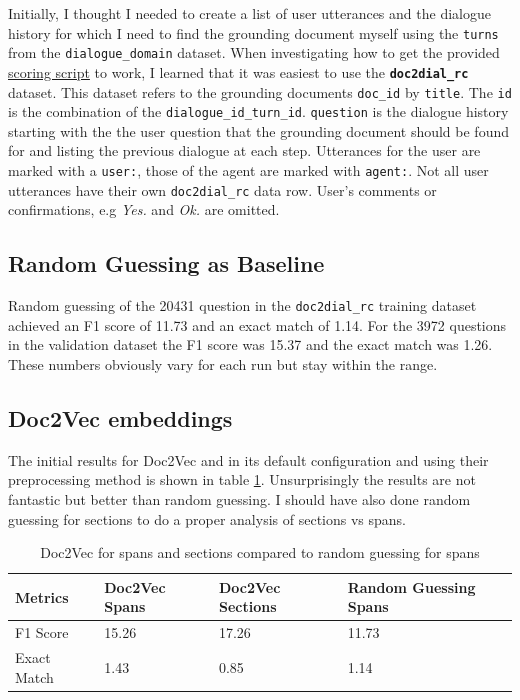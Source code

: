 \documentclass[11pt]{article}
\begin{document}
    Initially, I thought I needed to create a list of user utterances and the dialogue history for which I need to find the
    grounding document myself using the \texttt{turns} from the \texttt{dialogue\_domain} dataset. When investigating how
    to get the provided \href{https://github.com/doc2dial/sharedtask-dialdoc2021/blob/master/scripts/sharedtask_utils.py}{scoring script}
    to work, I learned that it was easiest to use the \textbf{\texttt{doc2dial\_rc}} dataset.
    This dataset refers to the grounding documents \texttt{doc\_id} by \texttt{title}.
    The \texttt{id} is the combination of the \texttt{dialogue\_id\_turn\_id}. \texttt{question} is the dialogue history starting
    with the the user question that the grounding document should be found for and listing the previous dialogue at each step.
    Utterances for the user are marked with a \texttt{user:}, those of the agent are marked with \texttt{agent:}. Not
    all user utterances have their own \texttt{doc2dial\_rc} data row. User's comments or confirmations, e.g \textit{Yes.} and
    \textit{Ok.} are omitted.

    \subsection{Random Guessing as Baseline}\label{subsec:random-guessing-results}

    Random guessing of the 20431 question in the \texttt{doc2dial\_rc} training dataset achieved an F1 score of 11.73
    and an exact match of 1.14. For the 3972 questions in the validation dataset the F1 score was 15.37 and the exact match
    was 1.26. These numbers obviously vary for each run but stay within the range.

    \subsection{Doc2Vec embeddings}\label{subsec:doc2vec-results}

    The initial results for Doc2Vec and in its default configuration and using their preprocessing method is shown
    in table \ref{table:simple-doc2vec-results}. Unsurprisingly the results are not fantastic but better than random
    guessing. I should have also done random guessing for sections to do a proper analysis of sections vs spans.

    \begin{table}[h!]
        \centering
        \begin{tabular}{|l|l|l|l|}
            \hline
            Metrics     & Doc2Vec Spans & Doc2Vec Sections & Random Guessing Spans \\ \hline
            F1 Score    & 15.26         & 17.26            & 11.73                 \\ \hline
            Exact Match & 1.43          & 0.85             & 1.14                  \\ \hline
        \end{tabular}
        \caption{Doc2Vec for spans and sections compared to random guessing for spans}
        \label{table:simple-doc2vec-results}
    \end{table}
\end{document}
